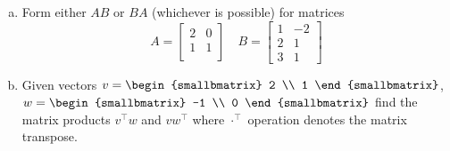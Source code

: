       \begin{question}
      \begin{enumerate}[(a)]
      \item Form either \(AB\) or \(BA\) (whichever is possible) for matrices
        \begin{equation*}
          A =
          \begin{bmatrix*}
            2 & 0  \\
            1 & 1 \\
          \end{bmatrix*}
      \quad
          B =
          \begin{bmatrix*}
            1 & -2 \\
            2 & 1 \\
            3 & 1
          \end{bmatrix*}
        \end{equation*}


      \item Given vectors \(v =
        \begin{smallbmatrix}
          2 \\ 1
        \end{smallbmatrix}
      \), \(w =
        \begin{smallbmatrix}
          -1 \\ 0
        \end{smallbmatrix}
        \)
        find the matrix products \(v^\top w\) and \(v w^\top\) where \(\cdot^{\top}\) operation denotes the matrix transpose.

      \end{enumerate}
      \end{question}

